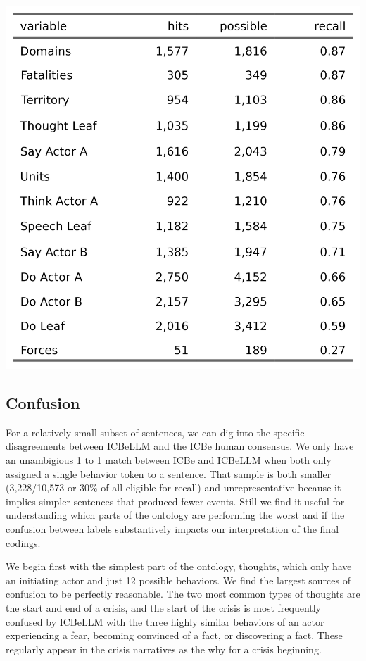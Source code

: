 \documentclass[
]{article}
\begin{document}
\begin{center}
\includegraphics{Table4.png}
\end{center}

\subsection{Confusion}\label{confusion}

For a relatively small subset of sentences, we can dig into the specific
disagreements between ICBeLLM and the ICBe human consensus. We only have
an unambigious 1 to 1 match between ICBe and ICBeLLM when both only
assigned a single behavior token to a sentence. That sample is both
smaller (3,228/10,573 or 30\% of all eligible for recall) and
unrepresentative because it implies simpler sentences that produced
fewer events. Still we find it useful for understanding which parts of
the ontology are performing the worst and if the confusion between
labels substantively impacts our interpretation of the final codings.

We begin first with the simplest part of the ontology, thoughts, which
only have an initiating actor and just 12 possible behaviors. We find
the largest sources of confusion to be perfectly reasonable. The two
most common types of thoughts are the start and end of a crisis, and the
start of the crisis is most frequently confused by ICBeLLM with the
three highly similar behaviors of an actor experiencing a fear, becoming
convinced of a fact, or discovering a fact. These regularly appear in
the crisis narratives as the why for a crisis beginning.
\end{document}
